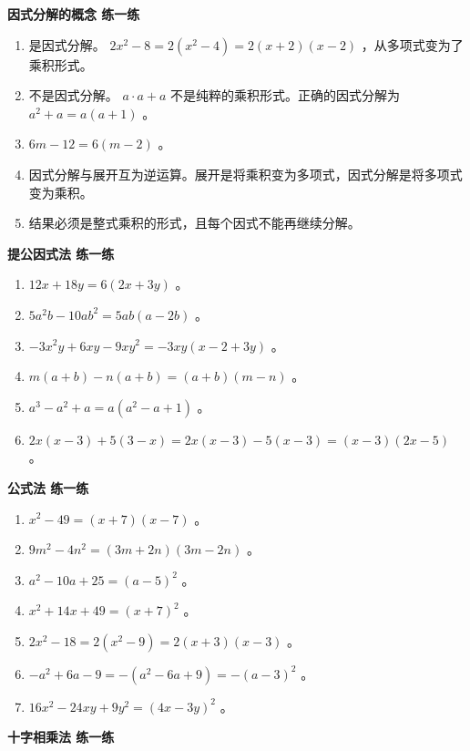 \begin{answer}


\textbf{因式分解的概念 练一练}

\begin{enumerate}
  \item 是因式分解。 $2x^2 - 8 = 2(x^2 - 4) = 2(x+2)(x-2)$ ，从多项式变为了乘积形式。
  \item 不是因式分解。 $a \cdot a + a$ 不是纯粹的乘积形式。正确的因式分解为 $a^2 + a = a(a + 1)$ 。
  \item $6m - 12 = 6(m - 2)$ 。
  \item 因式分解与展开互为逆运算。展开是将乘积变为多项式，因式分解是将多项式变为乘积。
  \item 结果必须是整式乘积的形式，且每个因式不能再继续分解。
\end{enumerate}


\textbf{提公因式法 练一练}

\begin{enumerate}
  \item $12x + 18y = 6(2x + 3y)$ 。
  \item $5a^2b - 10ab^2 = 5ab(a - 2b)$ 。
  \item $-3x^2y + 6xy - 9xy^2 = -3xy(x - 2 + 3y)$ 。
  \item $m(a + b) - n(a + b) = (a + b)(m - n)$ 。
  \item $a^3 - a^2 + a = a(a^2 - a + 1)$ 。
  \item $2x(x - 3) + 5(3 - x) = 2x(x - 3) - 5(x - 3) = (x - 3)(2x - 5)$ 。
\end{enumerate}


\textbf{公式法 练一练}

\begin{enumerate}
  \item $x^2 - 49 = (x + 7)(x - 7)$ 。
  \item $9m^2 - 4n^2 = (3m + 2n)(3m - 2n)$ 。
  \item $a^2 - 10a + 25 = (a - 5)^2$ 。
  \item $x^2 + 14x + 49 = (x + 7)^2$ 。
  \item $2x^2 - 18 = 2(x^2 - 9) = 2(x + 3)(x - 3)$ 。
  \item $-a^2 + 6a - 9 = -(a^2 - 6a + 9) = -(a - 3)^2$ 。
  \item $16x^2 - 24xy + 9y^2 = (4x - 3y)^2$ 。
\end{enumerate}


\textbf{十字相乘法 练一练}


\end{answer}
